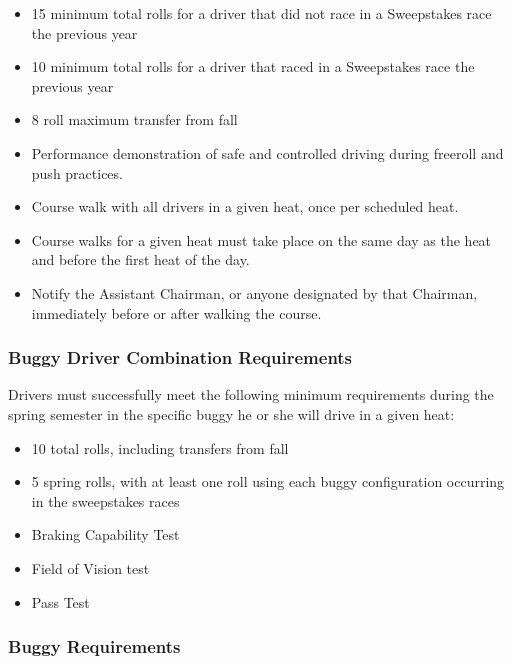 	\begin{itemize}

		\item 15 minimum total rolls for a driver that did not race in a 
		Sweepstakes race the previous year
		
		\item 10 minimum total rolls for a driver that raced in a 
		Sweepstakes race the previous year
		
		\item 8 roll maximum transfer from fall
		
		\item Performance demonstration of safe and controlled driving 
		during freeroll and push practices.
		
		\item Course walk with all drivers in a given heat, once per scheduled heat. 
		
		\item Course walks for a given heat must take place on the same day as the 
		heat and before the first heat of the day.
		
		\item Notify the Assistant Chairman, or anyone designated by that Chairman, 
		immediately before or after walking the course.
		
	\end{itemize}

\subsubsection{Buggy Driver Combination Requirements}
	Drivers must successfully meet the following minimum requirements during the spring 
	semester in the specific buggy he or she will drive in a given heat:

	\begin{itemize}

		\item 10 total rolls, including transfers from fall
		\item 5 spring rolls, with at least one roll using each 
		buggy configuration occurring in the sweepstakes races
		\item Braking Capability Test
		\item Field of Vision test
		\item Pass Test
		
	\end{itemize}

\subsubsection{Buggy Requirements}

